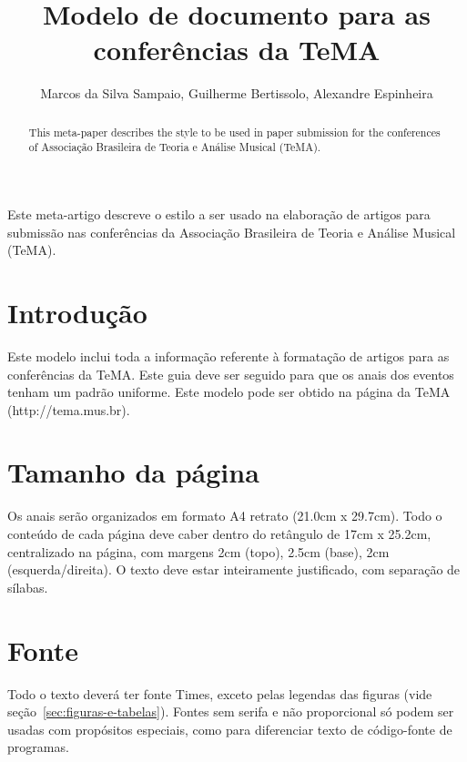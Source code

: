 \documentclass[12pt]{article}
\title{Modelo de documento para as conferências da TeMA}
\author{Marcos da Silva Sampaio\inst{1}, Guilherme Bertissolo\inst{1}, Alexandre Espinheira\inst{1}}
\begin{document}
\maketitle

\begin{abstract}
  This meta-paper describes the style to be used in paper submission
  for the conferences of Associação Brasileira de Teoria e Análise
  Musical (TeMA).
\end{abstract}


\begin{resumo}
  Este meta-artigo descreve o estilo a ser usado na elaboração de
  artigos para submissão nas conferências da Associação Brasileira de
  Teoria e Análise Musical (TeMA).
\end{resumo}


\section{Introdução}
\label{sec:gen}

Este modelo inclui toda a informação referente à formatação de artigos
para as conferências da TeMA. Este guia deve ser seguido para que os
anais dos eventos tenham um padrão uniforme. Este modelo pode ser
obtido na página da TeMA (http://tema.mus.br).


\section{Tamanho da página}
\label{sec:tamanho-pagina}

Os anais serão organizados em formato A4 retrato (21.0cm x 29.7cm).
Todo o conteúdo de cada página deve caber dentro do retângulo de 17cm
x 25.2cm, centralizado na página, com margens 2cm (topo), 2.5cm
(base), 2cm (esquerda/direita). O texto deve estar inteiramente
justificado, com separação de sílabas.

\section{Fonte}
\label{sec:fonte}

Todo o texto deverá ter fonte Times, exceto pelas legendas das figuras
(vide seção~\ref{sec:figuras-e-tabelas}). Fontes sem serifa e não
proporcional só podem ser usadas com propósitos especiais, como para
diferenciar texto de código-fonte de programas.
\end{document}
